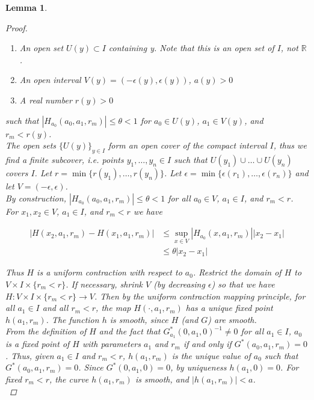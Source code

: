 \documentclass[12pt]{article}
\def\R{{\mathbb R}}
\newtheorem{lemma}{Lemma}
\begin{document}
\begin{lemma}
\begin{proof}
\begin{enumerate}
\item An open set $U(y) \subset I$ containing y. Note that this is an open set of $I$, not $\R$.
\item An open interval $V(y) = (-\epsilon(y), \epsilon(y))$, $a(y) > 0$
\item A real number $r(y) > 0$
\end{enumerate} 

such that $|H_{a_0}(a_0, a_1, r_m)| \leq \theta < 1$ for $a_0 \in U(y)$, $a_1 \in V(y)$, and $r_m < r(y)$.\\

The open sets $\{U(y)\}_{y \in I}$ form an open cover of the compact interval $I$, thus we find a finite subcover, i.e. points $y_1, \dots, y_n \in I$ such that $U(y_1) \cup \dots \cup U(y_n)$ covers $I$. Let $r = \min\{ r(y_1), \dots, r(y_n) \}$. Let $\epsilon = \min\{ \epsilon(r_1), \dots, \epsilon(r_n) \}$ and let $V = (-\epsilon, \epsilon)$.\\

By construction, $|H_{a_0}(a_0, a_1, r_m)| \leq \theta < 1$ for all $a_0 \in V$, $a_1 \in I$, and $r_m < r$. For $x_1, x_2 \in V$, $a_1 \in I$, and $r_m < r$ we have

\begin{align*}
|H(x_2, a_1, r_m) - H(x_1, a_1, r_m)| &\leq
\sup_{x \in V} |H_{a_0}(x, a_1, r_m)||x_2 - x_1| \\
&\leq \theta |x_2 - x_1|
\end{align*}

Thus $H$ is a uniform contraction with respect to $a_0$. Restrict the domain of $H$ to $V \times I \times \{ r_m < r \}$. If necessary, shrink $V$ (by decreasing $\epsilon$) so that we have $H: V \times I \times \{ r_m < r\} \rightarrow V$. Then by the uniform contraction mapping principle, for all $a_1 \in I$ and all $r_m < r$, the map $H(\cdot, a_1, r_m)$ has a unique fixed point $h(a_1, r_m)$. The function $h$ is smooth, since $H$ (and $G$) are smooth.\\

From the definition of $H$ and the fact that $G^*_{a_1}(0, a_1, 0)^{-1} \neq 0$ for all $a_1 \in I$, $a_0$ is a fixed point of $H$ with parameters $a_1$ and $r_m$ if and only if $G^*(a_0, a_1, r_m) = 0$. Thus, given $a_1 \in I$ and $r_m < r$, $h(a_1, r_m)$ is the unique value of $a_0$ such that $G^*(a_0, a_1, r_m) = 0$. Since $G^*(0, a_1, 0) = 0$, by uniqueness $h(a_1, 0) = 0$. For fixed $r_m < r$, the curve $h(a_1, r_m)$ is smooth, and $|h(a_1, r_m)| < a$.\\


\end{proof}
\end{lemma}
\end{document}
